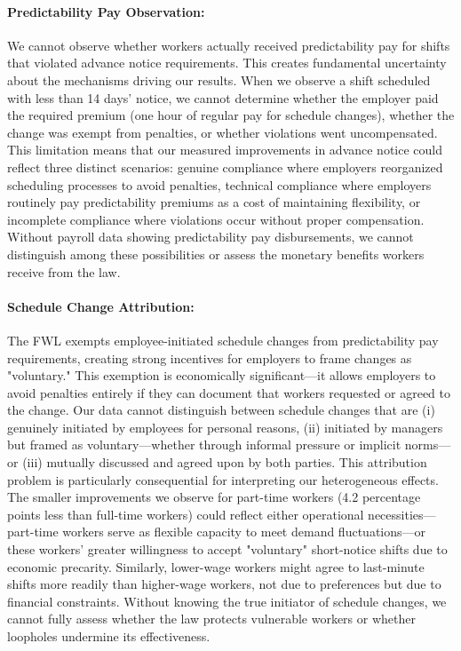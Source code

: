 \documentclass[letterpaper,11pt,leqno]{article}
\theoremstyle{paper}
\begin{document}
\paragraph{Predictability Pay Observation:} We cannot observe whether workers actually received predictability pay for shifts that violated advance notice requirements. This creates fundamental uncertainty about the mechanisms driving our results. When we observe a shift scheduled with less than 14 days' notice, we cannot determine whether the employer paid the required premium (one hour of regular pay for schedule changes), whether the change was exempt from penalties, or whether violations went uncompensated. This limitation means that our measured improvements in advance notice could reflect three distinct scenarios: genuine compliance where employers reorganized scheduling processes to avoid penalties, technical compliance where employers routinely pay predictability premiums as a cost of maintaining flexibility, or incomplete compliance where violations occur without proper compensation. Without payroll data showing predictability pay disbursements, we cannot distinguish among these possibilities or assess the monetary benefits workers receive from the law.

\paragraph{Schedule Change Attribution:} The FWL exempts employee-initiated schedule changes from predictability pay requirements, creating strong incentives for employers to frame changes as "voluntary." This exemption is economically significant—it allows employers to avoid penalties entirely if they can document that workers requested or agreed to the change. Our data cannot distinguish between schedule changes that are (i) genuinely initiated by employees for personal reasons, (ii) initiated by managers but framed as voluntary—whether through informal pressure or implicit norms—or (iii) mutually discussed and agreed upon by both parties. This attribution problem is particularly consequential for interpreting our heterogeneous effects. The smaller improvements we observe for part-time workers (4.2 percentage points less than full-time workers) could reflect either operational necessities—part-time workers serve as flexible capacity to meet demand fluctuations—or these workers' greater willingness to accept "voluntary" short-notice shifts due to economic precarity. Similarly, lower-wage workers might agree to last-minute shifts more readily than higher-wage workers, not due to preferences but due to financial constraints. Without knowing the true initiator of schedule changes, we cannot fully assess whether the law protects vulnerable workers or whether loopholes undermine its effectiveness.
\end{document}
